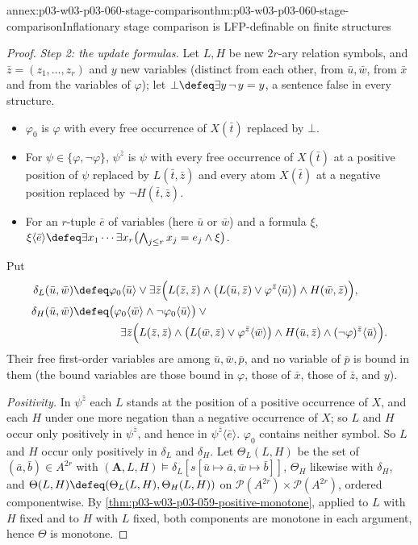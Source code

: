 \begin{annexitem}{annex:p03-w03-p03-060-stage-comparison}{thm:p03-w03-p03-060-stage-comparison}{Inflationary stage comparison is LFP-definable on finite structures}
\begin{proof}
\emph{Step 2: the update formulas.} Let \(L,H\) be new \(2r\)-ary relation
symbols, and \(\bar z=(z_1,\ldots,z_r)\) and \(y\) new variables (distinct
from each other, from \(\bar u,\bar w\), from \(\bar x\) and from the
variables of \(\varphi\)); let \(\bot\defeq\exists y\,\neg\,y=y\), a sentence false in
every structure.
\begin{itemize}
\item \(\varphi_0\) is \(\varphi\) with every free occurrence of \(X(\bar t)\) replaced by
      \(\bot\).
\item For \(\psi\in\{\varphi,\neg\varphi\}\), \(\psi^{\bar z}\) is \(\psi\)
      with every free occurrence of \(X(\bar t)\) at a positive position of \(\psi\)
      replaced by \(L(\bar t,\bar z)\) and every atom \(X(\bar t)\) at a
      negative position replaced by \(\neg H(\bar t,\bar z)\).
\item For an \(r\)-tuple \(\bar e\) of variables (here \(\bar u\) or
      \(\bar w\)) and a formula \(\xi\),
      \(\xi\langle\bar e\rangle\defeq\exists x_1\cdots\exists x_r\bigl(\bigwedge_{j\le r}x_j=e_j\wedge\xi\bigr)\).
\end{itemize}
Put
\begin{align*}
 \delta_L(\bar u,\bar w)&\defeq\varphi_0\langle\bar u\rangle\vee
 \exists\bar z\Bigl(L(\bar z,\bar z)\wedge\bigl(L(\bar u,\bar z)\vee\varphi^{\bar z}\langle\bar u\rangle\bigr)\wedge H(\bar w,\bar z)\Bigr),\\
 \delta_H(\bar u,\bar w)&\defeq\bigl(\varphi_0\langle\bar w\rangle\wedge\neg\varphi_0\langle\bar u\rangle\bigr)\vee{}\\
 &\phantom{{}\defeq{}}\exists\bar z\Bigl(L(\bar z,\bar z)\wedge\bigl(L(\bar w,\bar z)\vee\varphi^{\bar z}\langle\bar w\rangle\bigr)\wedge H(\bar u,\bar z)\wedge(\neg\varphi)^{\bar z}\langle\bar u\rangle\Bigr).
\end{align*}
Their free first-order variables are among \(\bar u,\bar w,\bar p\), and no
variable of \(\bar p\) is bound in them (the bound variables are those
bound in \(\varphi\), those of \(\bar x\), those of \(\bar z\), and \(y\)).

\emph{Positivity.} In \(\psi^{\bar z}\) each \(L\) stands at the position
of a positive occurrence of \(X\), and each \(H\) under one more negation
than a negative occurrence of \(X\); so \(L\) and \(H\) occur only
positively in \(\psi^{\bar z}\), and hence in \(\psi^{\bar z}\langle\bar e\rangle\).
\(\varphi_0\) contains neither symbol. So \(L\) and \(H\) occur only
positively in \(\delta_L\) and \(\delta_H\). Let
\(\Theta_L(L,H)\) be the set of \((\bar a,\bar b)\in A^{2r}\) with
\((\mathbf A,L,H)\models\delta_L[s[\bar u\mapsto\bar a,\bar w\mapsto\bar b]]\),
\(\Theta_H\) likewise with \(\delta_H\), and
\(\Theta(L,H)\defeq(\Theta_L(L,H),\Theta_H(L,H))\) on
\(\mathcal P(A^{2r})\times\mathcal P(A^{2r})\), ordered componentwise. By
\cref{thm:p03-w03-p03-059-positive-monotone}, applied to \(L\) with \(H\)
fixed and to \(H\) with \(L\) fixed, both components are monotone in each
argument, hence \(\Theta\) is monotone.


\end{proof}
\end{annexitem}

